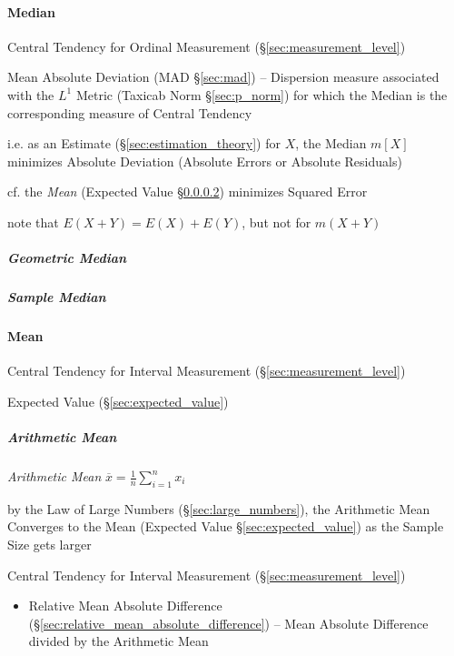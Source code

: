 \paragraph{Median}\label{sec:median}\hfill

Central Tendency for Ordinal Measurement (\S\ref{sec:measurement_level})

\fist Mean Absolute Deviation (MAD \S\ref{sec:mad}) -- Dispersion measure
associated with the $L^1$ Metric (Taxicab Norm \S\ref{sec:p_norm}) for which the
Median is the corresponding measure of Central Tendency

i.e. as an Estimate (\S\ref{sec:estimation_theory}) for $X$, the Median $m[X]$
minimizes Absolute Deviation (Absolute Errors or Absolute Residuals)

cf. the \emph{Mean} (Expected Value \S\ref{sec:mean}) minimizes Squared Error

note that $E(X + Y) = E(X) + E(Y)$, but not for $m(X+Y)$



\subparagraph{Geometric Median}\label{sec:geometric_median}\hfill

\subparagraph{Sample Median}\label{sec:sample_median}\hfill



\paragraph{Mean}\label{sec:mean}\hfill

Central Tendency for Interval Measurement (\S\ref{sec:measurement_level})

\fist Expected Value (\S\ref{sec:expected_value})



\subparagraph{Arithmetic Mean}\label{sec:arithmetic_mean}\hfill

\emph{Arithmetic Mean} $\overline{x} = \frac{1}{n}\sum_{i=1}^n x_i$

by the Law of Large Numbers (\S\ref{sec:large_numbers}), the Arithmetic Mean
Converges to the Mean (Expected Value \S\ref{sec:expected_value}) as the Sample
Size gets larger

Central Tendency for Interval Measurement (\S\ref{sec:measurement_level})

\begin{itemize}
  \item Relative Mean Absolute Difference
    (\S\ref{sec:relative_mean_absolute_difference}) -- Mean Absolute Difference
    divided by the Arithmetic Mean
\end{itemize}



